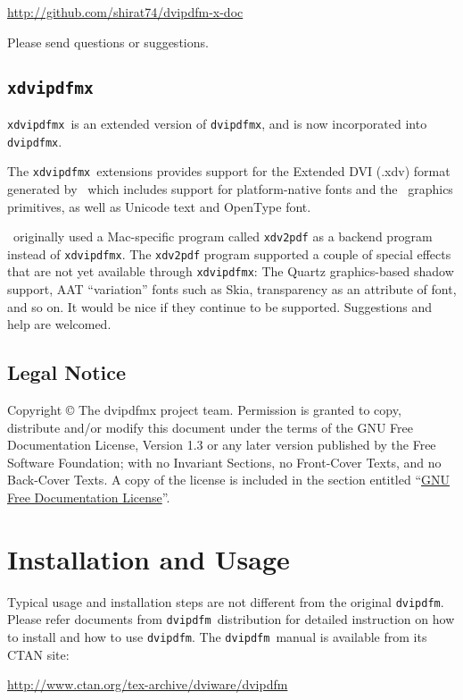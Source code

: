 \documentclass[a4paper,xetex,oneside]{book}
\newcommand{\code}[1]{\mbox{\texttt{#1}}}
\newcommand{\dvipdfm}{\texttt{dvipdfm}}
\newcommand{\dvipdfmx}{\texttt{dvipdfmx}}
\newcommand{\xdvipdfmx}{\texttt{xdvipdfmx}}
\begin{document}
\url{http://github.com/shirat74/dvipdfm-x-doc}
\medskip

\noindent{}Please send questions or suggestions.

\subsection{\xdvipdfmx}

\xdvipdfmx\ is an extended version of \dvipdfmx, and is now incorporated into
\dvipdfmx.

The \xdvipdfmx\ extensions provides support for the Extended DVI (.xdv) format
generated by \XeTeX\ which includes support for platform-native fonts and the
\XeTeX\ graphics primitives, as well as Unicode text and OpenType font.

\XeTeX\ originally used a Mac-specific program called \code{xdv2pdf} as a
backend program instead of \xdvipdfmx. The \code{xdv2pdf} program supported
a couple of special effects that are not yet available through \xdvipdfmx:
The Quartz graphics-based shadow support, AAT ``variation'' fonts such as Skia,
transparency as an attribute of font, and so on.
It would be nice if they continue to be supported. Suggestions and help are
welcomed.


\subsection{Legal Notice}

Copyright © The dvipdfmx project team.
Permission is granted to copy, distribute and/or modify this document
under the terms of the GNU Free Documentation License, Version 1.3
or any later version published by the Free Software Foundation;
with no Invariant Sections, no Front-Cover Texts, and no Back-Cover Texts.
A copy of the license is included in the section entitled
``\hyperref[SEC:FDL]{GNU Free Documentation License}''.

\section{Installation and Usage}

Typical usage and installation steps are not different from the original
\dvipdfm. Please refer documents from \dvipdfm\ distribution for detailed
instruction on how to install and how to use \dvipdfm. The \dvipdfm\ manual is
available from its CTAN site:\medskip

\url{http://www.ctan.org/tex-archive/dviware/dvipdfm}
\medskip
\end{document}
